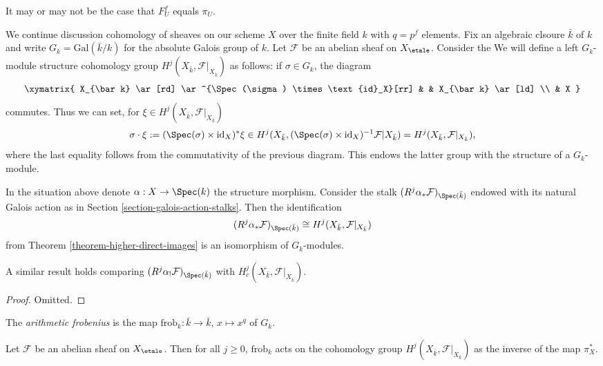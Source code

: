 \begin{remark}
\label{remark-may-be-confusing}
It may or may not be the case that $F^f_U$ equals $\pi_U$.
\end{remark}

\noindent
We continue discussion cohomology of sheaves on our scheme $X$ over
the finite field $k$ with $q = p^f$ elements.
Fix an algebraic clsoure $\bar k$ of $k$ and write $G_k =
\text{Gal}(\bar k/k)$ for the absolute Galois group of $k$.
Let $\mathcal{F}$ be an abelian sheaf on $X_\etale$. Consider the
We will define a left $G_k$-module structure
cohomology group $H^j (X_{\bar k}, \mathcal{F}|_{X_{\bar k}})$
as follows: if $\sigma \in G_k$, the diagram
$$
\xymatrix{
X_{\bar k} \ar[rd] \ar^{\Spec(\sigma) \times \text{id}_X}[rr] & &
X_{\bar k} \ar[ld] \\
& X
}
$$
commutes. Thus we can set, for $\xi \in H^j (X_{\bar k}, \mathcal{F}|_{X_{\bar
k}})$
$$
\sigma \cdot \xi := (\Spec(\sigma) \times \text{id}_X)^*\xi \in
H^j(X_{\bar k}, (\Spec(\sigma) \times \text{id}_X)^{-1}
\mathcal{F}|{X_{\bar k}})
= H^j (X_{\bar k}, \mathcal{F}|_{X_{\bar k}}),
$$
where the last equality follows from the commutativity of the previous diagram.
This endows the latter group with the structure of a $G_k$-module.

\begin{lemma}
\label{lemma-two-actions-agree}
In the situation above denote $\alpha : X \to \Spec(k)$ the structure morphism.
Consider the stalk $(R^j\alpha_*\mathcal{F})_{\Spec(\bar k)}$ endowed with its
natural Galois action as in Section \ref{section-galois-action-stalks}. Then
the identification
$$
(R^j\alpha_*\mathcal{F})_{\Spec(\bar k)} \cong H^j (X_{\bar k},
\mathcal{F}|_{X_{\bar k}})
$$
from Theorem \ref{theorem-higher-direct-images} is an isomorphism of
$G_k$-modules.
\end{lemma}

\noindent
A similar result holds comparing
$(R^j\alpha_!\mathcal{F})_{\Spec(\bar k)}$ with
$H^j_c (X_{\bar k}, \mathcal{F}|_{X_{\bar k}})$.

\begin{proof}
Omitted.
\end{proof}

\begin{definition}
\label{definition-arithmetic-frobenius}
The {\it arithmetic frobenius} is the map
$\text{frob}_k : \bar k \to \bar k$, $x \mapsto x^q$ of $G_k$.
\end{definition}

\begin{theorem}
\label{theorem-geometric-arithmetic-inverse}
Let $\mathcal{F}$ be an abelian sheaf on $X_\etale$. Then for all
$j\geq 0$, $\text{frob}_k$ acts on the cohomology group $H^j(X_{\bar k},
\mathcal{F}|_{X_{\bar k}})$ as the inverse of the map $\pi_X^*$.
\end{theorem}

